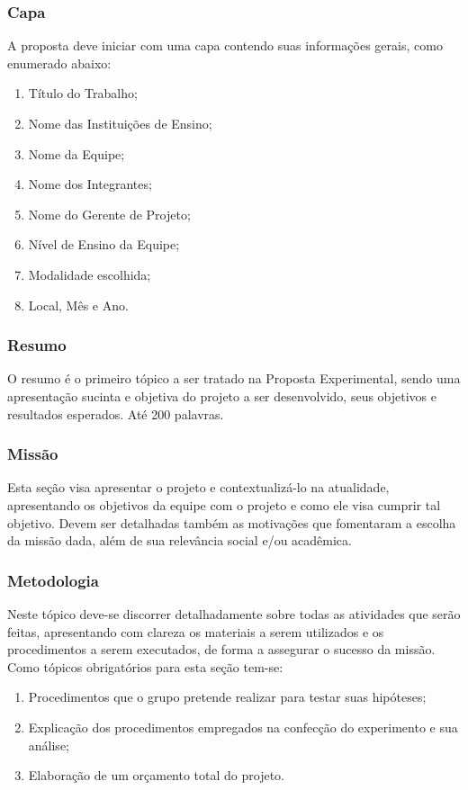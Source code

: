         \subsubsection{Capa}
            A proposta deve iniciar com uma capa contendo suas informações gerais, como enumerado abaixo:
            \begin{enumerate}
                \item Título do Trabalho; 
                \item Nome das Instituições de Ensino; 
                \item Nome da Equipe; 
                \item Nome dos Integrantes; 
                \item Nome do Gerente de Projeto;
                \item Nível de Ensino da Equipe;
                \item Modalidade escolhida;
                \item Local, Mês e Ano. 
            \end{enumerate}
                    
        \subsubsection{Resumo}
            O resumo é o primeiro tópico a ser tratado na Proposta Experimental, sendo uma apresentação sucinta e objetiva do projeto a ser desenvolvido, seus objetivos e resultados esperados. Até 200 palavras.
                
        \subsubsection{Missão}
            Esta seção visa apresentar o projeto e contextualizá-lo na atualidade, apresentando os objetivos da equipe com o projeto e como ele visa cumprir tal objetivo. Devem ser detalhadas também as motivações que fomentaram a escolha da missão dada, além de sua relevância social e/ou acadêmica.
                
        \subsubsection{Metodologia}
            Neste tópico deve-se discorrer detalhadamente sobre todas as atividades que serão feitas, apresentando com clareza os materiais a serem utilizados e os procedimentos a serem executados, de forma a assegurar o sucesso da missão. Como tópicos obrigatórios para esta seção tem-se:
            \begin{enumerate}
                \item Procedimentos que o grupo pretende realizar para testar suas hipóteses;
                \item Explicação dos procedimentos empregados na confecção do experimento e sua análise;
                \item Elaboração de um orçamento total do projeto.
            \end{enumerate}

